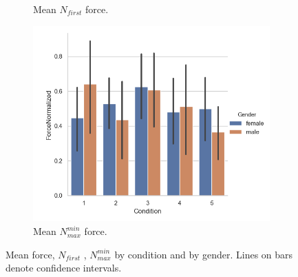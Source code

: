 \begin{figure}[H]
\begin{subfigure}[b]{0.3\textwidth}
         \caption{Mean $N_{first}$ force.}
     \label{fig:forceN1MeanGen}
     \end{subfigure}
        \hspace{7mm}
      \begin{subfigure}[b]{0.3\textwidth}
         \centering
     \includegraphics[scale=0.4]{Files/Plots/forceNormalized_mean_by_condition_gen.png}
         \caption{Mean $N_{max}^{min}$ force.}
     \label{fig:forceN2MeanGen}
     \end{subfigure}
     \caption{Mean force, $N_{first}$ , $N_{max}^{min}$  by condition and by gender. Lines on bars denote confidence intervals.}
     \label{fig:forceMeanGenAll}
\end{figure} 
